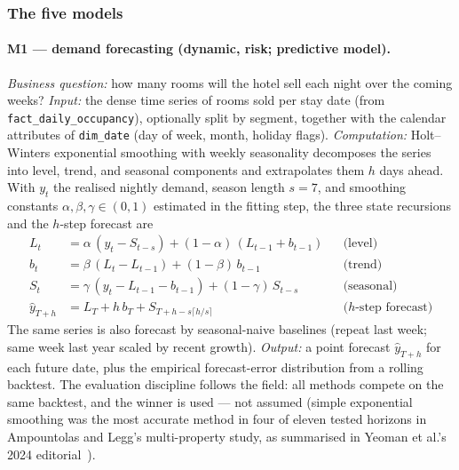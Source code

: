 \subsubsection{The five models}

\paragraph{M1 --- demand forecasting (dynamic, risk; predictive model).}
\emph{Business question:} how many rooms will the hotel sell each night over the coming weeks? \emph{Input:} the dense time series of rooms sold per stay date (from \texttt{fact\_daily\_occupancy}), optionally split by segment, together with the calendar attributes of \texttt{dim\_date} (day of week, month, holiday flags). \emph{Computation:} Holt--Winters exponential smoothing with weekly seasonality decomposes the series into level, trend, and seasonal components and extrapolates them $h$ days ahead. With $y_t$ the realised nightly demand, season length $s = 7$, and smoothing constants $\alpha, \beta, \gamma \in (0,1)$ estimated in the fitting step, the three state recursions and the $h$-step forecast are
\begin{align}
L_t &= \alpha\,(y_t - S_{t-s}) + (1-\alpha)\,(L_{t-1} + b_{t-1}) && \text{(level)} \label{eq:m1level}\\
b_t &= \beta\,(L_t - L_{t-1}) + (1-\beta)\,b_{t-1} && \text{(trend)} \label{eq:m1trend}\\
S_t &= \gamma\,(y_t - L_{t-1} - b_{t-1}) + (1-\gamma)\,S_{t-s} && \text{(seasonal)} \label{eq:m1seasonal}\\
\hat{y}_{T+h} &= L_T + h\,b_T + S_{T+h-s\lceil h/s \rceil} && \text{($h$-step forecast)} \label{eq:m1forecast}
\end{align}
The same series is also forecast by seasonal-naive baselines (repeat last week; same week last year scaled by recent growth). \emph{Output:} a point forecast $\hat{y}_{T+h}$ for each future date, plus the empirical forecast-error distribution from a rolling backtest. The evaluation discipline follows the field: all methods compete on the same backtest, and the winner is used --- not assumed (simple exponential smoothing was the most accurate method in four of eleven tested horizons in Ampountolas and Legg's multi-property study, as summarised in Yeoman et al.'s 2024 editorial~\cite{yeoman2024}).

